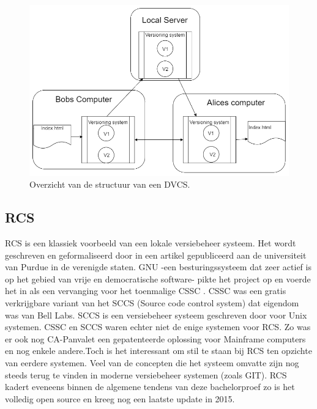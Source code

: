 \begin{itemize}
\begin{figure}[h!]
	\centering
	\caption[Overzicht structuur DVCS]{Overzicht van de structuur van een DVCS.}
	\label{fig:dvcs}
	\includegraphics[scale=0.5]{DVCS.png}
\end{figure}

\end{itemize}

\subsection{RCS}

RCS is een klassiek voorbeeld van een lokale versiebeheer systeem. Het wordt geschreven en geformaliseerd door \textcite{Tichy85rcs} in een artikel gepubliceerd aan de universiteit van Purdue in de verenigde staten. GNU -een besturingssysteem dat zeer actief is op het gebied van vrije en democratische software- pikte het project op en voerde het in als een vervanging voor het toenmalige CSSC \autocite{GNUCSSC}. CSSC was een gratis verkrijgbare variant van het SCCS (Source code control system) dat eigendom was van Bell Labs. SCCS is een versiebeheer systeem geschreven door \textcite{Rochkind1975} voor Unix systemen. CSSC en SCCS waren echter niet de enige systemen voor RCS. Zo was er ook nog CA-Panvalet een gepatenteerde oplossing voor Mainframe computers en nog enkele andere.Toch is het interessant om stil te staan bij RCS ten opzichte van eerdere systemen. Veel van de concepten die het systeem omvatte zijn nog steeds terug te vinden in moderne versiebeheer systemen (zoals GIT). RCS kadert eveneens binnen de algemene tendens van deze bachelorproef zo is het volledig open source en kreeg nog een laatste update in 2015.\\

